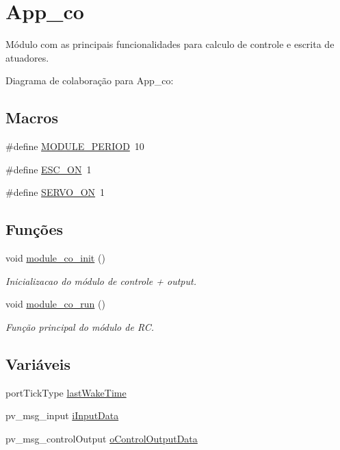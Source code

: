 \hypertarget{group__app__co}{\section{App\-\_\-co}
\label{group__app__co}
}


Módulo com as principais funcionalidades para calculo de controle e escrita de atuadores.  


Diagrama de colaboração para App\-\_\-co\-:
\subsection*{Macros}
\begin{DoxyCompactItemize}
\item 
\#define \hyperlink{group__app__co_ga0ac6c9f2991b096e49c354e5cce6fae0}{M\-O\-D\-U\-L\-E\-\_\-\-P\-E\-R\-I\-O\-D}~10
\item 
\#define \hyperlink{group__app__co_gaec8246e954743c1eca3ed9d0b934bf8e}{E\-S\-C\-\_\-\-O\-N}~1
\item 
\#define \hyperlink{group__app__co_ga162e9e4abd94f1558733bbf17fca28e9}{S\-E\-R\-V\-O\-\_\-\-O\-N}~1
\end{DoxyCompactItemize}
\subsection*{Funções}
\begin{DoxyCompactItemize}
\item 
void \hyperlink{group__app__co_gabedb9a5c3739466a359c93b3585a3640}{module\-\_\-co\-\_\-init} ()
\begin{DoxyCompactList}\small\item\em Inicializacao do módulo de controle + output. \end{DoxyCompactList}\item 
void \hyperlink{group__app__co_gaab8216fc955d01b47e3431aae288d9d3}{module\-\_\-co\-\_\-run} ()
\begin{DoxyCompactList}\small\item\em Função principal do módulo de R\-C. \end{DoxyCompactList}\end{DoxyCompactItemize}
\subsection*{Variáveis}
\begin{DoxyCompactItemize}
\item 
port\-Tick\-Type \hyperlink{group__app__co_gaa8db3871cb5f64abbd94ddd5a1db73a6}{last\-Wake\-Time}
\item 
pv\-\_\-msg\-\_\-input \hyperlink{group__app__co_gac40b8cfe5fd2000670ad57fe3e75ec89}{i\-Input\-Data}
\item 
pv\-\_\-msg\-\_\-control\-Output \hyperlink{group__app__co_ga0a14ca4568444d2d76c256fa91585cdf}{o\-Control\-Output\-Data}
\end{DoxyCompactItemize}


